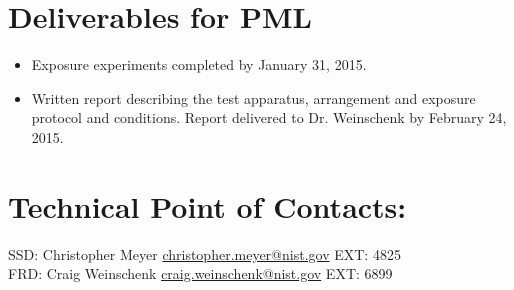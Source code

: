 \documentclass[12pt,letterpaper]{article}
\begin{document}
\clearpage

\section{Deliverables for PML}
\begin{itemize}
\item Exposure experiments completed by January 31, 2015.
\item Written report describing the test apparatus, arrangement and exposure protocol and conditions. Report delivered to Dr. Weinschenk by February 24, 2015.
\end{itemize}

\section{Technical Point of Contacts:}

SSD: Christopher Meyer \href{mailto:christopher.meyer@nist.gov}{christopher.meyer@nist.gov} EXT: 4825 \\
FRD: Craig Weinschenk \href{matilto:craig.weinschenk@nist.gov}{craig.weinschenk@nist.gov} EXT: 6899  
\end{document}
